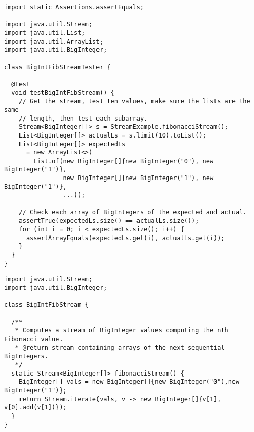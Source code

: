 \begin{cl}[]{}
\begin{lstlisting}[language=MyJava]
import static Assertions.assertEquals;

import java.util.Stream;
import java.util.List;
import java.util.ArrayList;
import java.util.BigInteger;

class BigIntFibStreamTester {

  @Test
  void testBigIntFibStream() {
    // Get the stream, test ten values, make sure the lists are the same
    // length, then test each subarray.
    Stream<BigInteger[]> s = StreamExample.fibonacciStream();
    List<BigInteger[]> actualLs = s.limit(10).toList();
    List<BigInteger[]> expectedLs 
      = new ArrayList<>(
        List.of(new BigInteger[]{new BigInteger("0"), new BigInteger("1")},
                new BigInteger[]{new BigInteger("1"), new BigInteger("1")},
                ...));

    // Check each array of BigIntegers of the expected and actual.
    assertTrue(expectedLs.size() == actualLs.size());
    for (int i = 0; i < expectedLs.size(); i++) {
      assertArrayEquals(expectedLs.get(i), actualLs.get(i));
    }
  }
}
\end{lstlisting}
\end{cl}

\begin{cl}[]{}
\begin{lstlisting}[language=MyJava]
import java.util.Stream;
import java.util.BigInteger;

class BigIntFibStream {

  /**
   * Computes a stream of BigInteger values computing the nth Fibonacci value.
   * @return stream containing arrays of the next sequential BigIntegers.
   */
  static Stream<BigInteger[]> fibonacciStream() {
    BigInteger[] vals = new BigInteger[]{new BigInteger("0"),new BigInteger("1")};
    return Stream.iterate(vals, v -> new BigInteger[]{v[1], v[0].add(v[1])});
  }
}
\end{lstlisting}
\end{cl}

